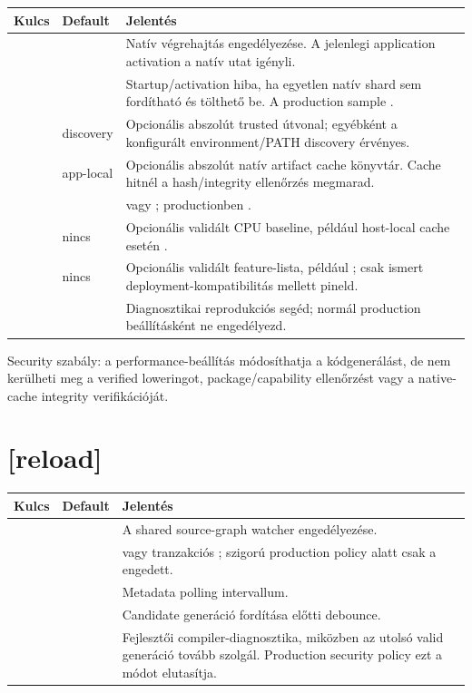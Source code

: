 \begin{longtable}{L{0.34\textwidth}L{0.18\textwidth}L{0.38\textwidth}}
\toprule
Kulcs & Default & Jelentés \\
\midrule
{} &  & Natív végrehajtás engedélyezése. A jelenlegi application activation a natív utat igényli. \\
 &  & Startup/activation hiba, ha egyetlen natív shard sem fordítható és tölthető be. A production sample . \\
 & discovery & Opcionális abszolút trusted  útvonal; egyébként a konfigurált environment/PATH discovery érvényes. \\
 & app-local & Opcionális abszolút natív artifact cache könyvtár. Cache hitnél a hash/integrity ellenőrzés megmarad. \\
 &  &  vagy ; productionben . \\
 & nincs & Opcionális validált CPU baseline, például host-local cache esetén . \\
 & nincs & Opcionális validált feature-lista, például ; csak ismert deployment-kompatibilitás mellett pineld. \\
 &  & Diagnosztikai reprodukciós segéd; normál production beállításként ne engedélyezd. \\
\bottomrule
\end{longtable}

Security szabály: a performance-beállítás módosíthatja a kódgenerálást, de nem kerülheti meg a verified loweringot, package/capability ellenőrzést vagy a native-cache integrity verifikációját.

\section{[reload]}

\begin{longtable}{L{0.34\textwidth}L{0.18\textwidth}L{0.38\textwidth}}
\toprule
Kulcs & Default & Jelentés \\
\midrule
{} &  & A shared source-graph watcher engedélyezése. \\
 &  &  vagy tranzakciós ; szigorú production policy alatt csak a  engedett. \\
 &  & Metadata polling intervallum. \\
 &  & Candidate generáció fordítása előtti debounce. \\
 &  & Fejlesztői compiler-diagnosztika, miközben az utolsó valid generáció tovább szolgál. Production security policy ezt a módot elutasítja. \\
\bottomrule
\end{longtable}

